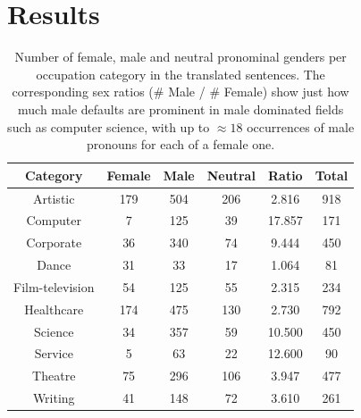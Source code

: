\documentclass{article}
\begin{document}
\section{Results}

\begin{table}[H]
	\centering
	\begin{tabular}{|c|c|c|c|c|c|}
	\hline
	Category & Female & Male & Neutral & Ratio & Total \\ \hline
	\hline
	Artistic        & 179    & 504  & 206     & 2.816 	& 918 \\ \hline
	Computer        & 7      & 125  & 39      & 17.857 	& 171 \\ \hline
	Corporate       & 36     & 340  & 74      & 9.444 	& 450 \\ \hline
	Dance           & 31     & 33   & 17      & 1.064 	& 81  \\ \hline
	Film-television & 54     & 125  & 55      & 2.315 	& 234 \\ \hline
	Healthcare      & 174    & 475  & 130     & 2.730 	& 792 \\ \hline
	Science         & 34     & 357  & 59      & 10.500 	& 450 \\ \hline
	Service         & 5      & 63   & 22      & 12.600 	& 90  \\ \hline
	Theatre         & 75     & 296  & 106     & 3.947 	& 477 \\ \hline
	Writing         & 41     & 148  & 72      & 3.610 	& 261 \\ \hline
	\end{tabular}
	\label{tab:gender-by-category}
	\caption{Number of female, male and neutral pronominal genders per occupation category in the translated sentences. The corresponding sex ratios (\# Male / \# Female) show just how much male defaults are prominent in male dominated fields such as computer science, with up to $\approx 18$ occurrences of male pronouns for each of a female one.}
\end{table}
\end{document}
